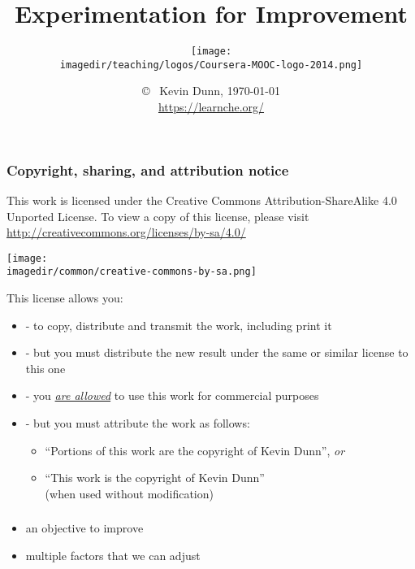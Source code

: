 \documentclass[handout,11pt,aspectratio=169,mathserif]{beamer}
\title[]{\LARGE Experimentation for Improvement}
\subtitle[]{\vspace{0.5cm} \texttt{[image: \\imagedir/teaching/logos/Coursera-MOOC-logo-2014.png]} \vspace{-1.5cm} }\author[]{}
\institute[]{}
\date[]{\copyright~ Kevin Dunn, \today \\ \vspace{0cm}
{{\footnotesize {\tt } \href{https://learnche.org/}{https://learnche.org/}\\} \vspace{0.5cm}}
{\LARGE \color{blue}{Design and Analysis of Experiments - An Overview}}
}
\begin{document}
	
\begin{frame} \titlepage \end{frame}

\begin{frame}\frametitle{Copyright, sharing, and attribution notice}

	{\footnotesize This work is licensed under the Creative Commons Attribution-ShareAlike 4.0 Unported License. To view a copy of this license, 
	please visit \href{http://creativecommons.org/licenses/by-sa/3.0/}{http://creativecommons.org/licenses/by-sa/4.0/}}
	
	\vspace{0.0cm}
	\begin{flushright}
		\texttt{[image: \\imagedir/common/creative-commons-by-sa.png]}
	\end{flushright}	
	\vspace{-0.4cm}
	\begin{exampleblock}{}
		{\small This license allows you: }
		\begin{itemize}
			\item	{} - to copy, distribute and transmit the work, including print it
			\item	{} - but you must distribute the new result under the same or similar license to this one
			\item	{} - you \underline{\emph{are allowed}} to use this work for commercial purposes 
			\item	{} - but you must attribute the work as follows:
			\begin{itemize}
				\item	``Portions of this work are the copyright of Kevin Dunn'', \emph{or}
				\item	``This work is the copyright of Kevin Dunn'' \\{\tiny (when used without modification)}
			\end{itemize} 
		\end{itemize}
	\end{exampleblock}
\end{frame}



\begin{frame}\frametitle{}
	\begin{itemize}
		\item	\LARGE an {\color{purple}objective} to improve
		\item	\LARGE multiple {\color{purple}factors} that we can adjust
	\end{itemize}
\end{frame}
\end{document}
